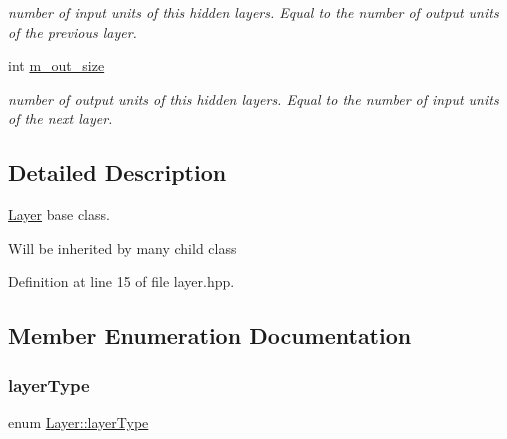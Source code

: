 \begin{DoxyCompactItemize}
\begin{DoxyCompactList}\small\item\em number of input units of this hidden layers. Equal to the number of output units of the previous layer. \end{DoxyCompactList}\item 
int \hyperlink{class_layer_a20c7215be5d6769fb04c19dba7e1bb6e}{m\+\_\+out\+\_\+size}
\begin{DoxyCompactList}\small\item\em number of output units of this hidden layers. Equal to the number of input units of the next layer. \end{DoxyCompactList}\end{DoxyCompactItemize}


\subsection{Detailed Description}
\hyperlink{class_layer}{Layer} base class. 

Will be inherited by many child class 

Definition at line 15 of file layer.\+hpp.



\subsection{Member Enumeration Documentation}
\mbox{\label{class_layer_a823f18343920cda4f52dce36df6e851f}} 
\subsubsection{\texorpdfstring{layer\+Type}{layerType}}
{\footnotesize\ttfamily enum \hyperlink{class_layer_a823f18343920cda4f52dce36df6e851f}{Layer\+::layer\+Type}}

